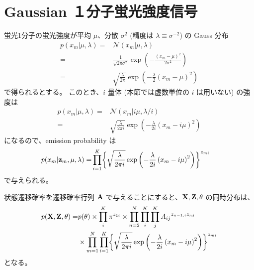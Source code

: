 
\section{ Gaussian １分子蛍光強度信号 }

蛍光1分子の蛍光強度が平均 $\mu$、分散 $\sigma^2$ (精度は $\lambda \equiv \sigma^{-2}$) の Gauss 分布
\begin{align}
  p( x_m | \mu, \lambda )  =&  \mathcal{N}\left( x_m | \mu, \lambda \right)  \\
%
  =&  \frac{1}{\sqrt{ 2 \pi {\sigma}^2}} \exp\left( - \frac {\left( x_m - \mu \right)^2 }{2 {\sigma}^2} \right)  \\
%
    =&  \sqrt{\frac{\lambda}{2 \pi}} \exp\left( - \frac {\lambda}{2} \left( x_m - \mu \right)^2 \right)  
\end{align}
で得られるとする。
このとき、$i$ 量体 (本節では虚数単位の $i$ は用いない) の強度は
\begin{align}
  p( x_m | \mu, \lambda )  =&  \mathcal{N}\left( x_m | i \mu, \lambda/i \right)  \\
%
  =&  \sqrt{\frac{\lambda}{2 \pi i}} \exp\left( - \frac {\lambda}{2 i} \left( x_m - i \mu \right)^2 \right)  
\end{align}
になるので、emission probability  は
\begin{align}
  p( x_m | {\bf z}_m, \mu, \lambda )  =&  \prod_{i=1}^K \biggl\{ \sqrt{\frac{\lambda}{2 \pi i}} \exp\left( - \frac {\lambda}{2 i} \left( x_m - i \mu \right)^2 \right) \biggr\}^{z_{mi}}  \label{eqn:gaussInt_pXnZn}  
\end{align}
で与えられる。


状態遷移確率を遷移確率行列 ${\bf A}$ で与えることにすると、${\bf X}, {\bf Z}, \theta$ の同時分布は、
\begin{align}
  p( {\bf X}, {\bf Z}, \theta )  =&  p( \theta ) \times \prod_i^K \pi^{z_{1i}}  
    \times \prod_{n=2}^N \prod_i^K \prod_{j}^K {A_{ij}}^{ z_{n-1, i} z_{nj} }  \notag  \\  
    &  \times \prod_{m=1}^N \prod_{i=1}^K \biggl\{ \sqrt{\frac{\lambda}{2 \pi i}} \exp\left( - \frac {\lambda}{2 i} \left( x_m - i \mu \right)^2 \right) \biggr\}^{z_{mi}}  
\end{align}
となる。


